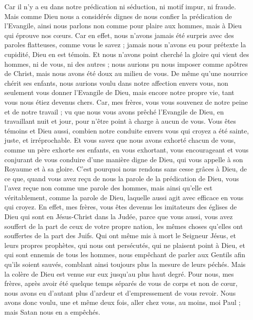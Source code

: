 \begin{multicols}{2}
Car il n'y a eu dans notre prédication ni séduction, ni motif impur, ni fraude.
Mais comme Dieu nous a considérés dignes de nous confier la prédication de l'Evangile, ainsi nous parlons non comme pour plaire aux hommes, mais à Dieu qui éprouve nos cœurs.
Car en effet, nous n'avons jamais été surpris avec des paroles flatteuses, comme vous le savez ; jamais nous n'avons eu pour prétexte la cupidité, Dieu en est témoin.
Et nous n'avons point cherché la gloire qui vient des hommes, ni de vous, ni des autres ; nous aurions pu nous imposer comme apôtres de Christ,
mais nous avons été doux au milieu de vous. De même qu'une nourrice chérit ses enfants,
nous aurions voulu dans notre affection envers vous, non seulement vous donner l'Evangile de Dieu, mais encore notre propre vie, tant vous nous étiez devenus chers.
 Car, mes frères, vous vous souvenez de notre peine et de notre travail ; vu que nous vous avons prêché l'Evangile de Dieu, en travaillant nuit et jour, pour n'être point à charge à aucun de vous.
Vous êtes témoins et Dieu aussi, combien notre conduite envers vous qui croyez a été sainte, juste, et irréprochable.
Et vous savez que nous avons exhorté chacun de vous, comme un père exhorte ses enfants,
en vous exhortant, vous encourageant et vous conjurant de vous conduire d'une manière digne de Dieu, qui vous appelle à son Royaume et à sa gloire.
C'est pourquoi nous rendons sans cesse grâces à Dieu, de ce que, quand vous avez reçu de nous la parole de la prédication de Dieu, vous l'avez reçue non comme une parole des hommes, mais ainsi qu'elle est véritablement, comme la parole de Dieu, laquelle aussi agit avec efficace en vous qui croyez.
En effet, mes frères, vous êtes devenus les imitateurs des églises de Dieu qui sont en Jésus-Christ dans la Judée, parce que vous aussi, vous avez souffert de la part de ceux de votre propre nation, les mêmes choses qu'elles ont souffertes de la part des Juifs.
Qui ont même mis à mort le Seigneur Jésus, et leurs propres prophètes, qui nous ont persécutés, qui ne plaisent point à Dieu, et qui sont ennemis de tous les hommes,
nous empêchant de parler aux Gentils afin qu'ils soient sauvés, comblant ainsi toujours plus la mesure de leurs péchés. Mais la colère de Dieu est venue sur eux jusqu'au plus haut degré.
Pour nous, mes frères, après avoir été quelque temps séparés de vous de corps et non de cœur, nous avons eu d'autant plus d'ardeur et d'empressement de vous revoir.
Nous avons donc voulu, une et même deux fois, aller chez vous, au moins, moi Paul ; mais Satan nous en a empêchés.

\end{multicols}
